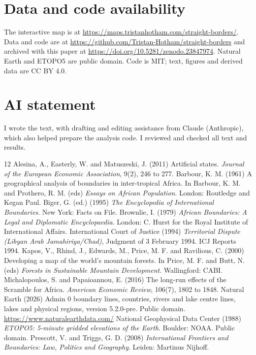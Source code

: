 \documentclass[11pt,a4paper]{article}
\begin{document}
\section*{Data and code availability}
The interactive map is at \url{https://maps.tristanhotham.com/straight-borders/}. Data and code are at \url{https://github.com/Tristan-Hotham/straight-borders} and archived with this paper at \url{https://doi.org/10.5281/zenodo.23847974}. Natural Earth and ETOPO5 are public domain. Code is MIT; text, figures and derived data are CC BY 4.0.

\section*{AI statement}
I wrote the text, with drafting and editing assistance from Claude (Anthropic), which also helped prepare the analysis code. I reviewed and checked all text and results.

\begin{thebibliography}{12}
 Alesina, A., Easterly, W. and Matuszeski, J. (2011) Artificial states. \emph{Journal of the European Economic Association}, 9(2), 246 to 277.
 Barbour, K. M. (1961) A geographical analysis of boundaries in inter-tropical Africa. In Barbour, K. M. and Prothero, R. M. (eds) \emph{Essays on African Population}. London: Routledge and Kegan Paul.
 Biger, G. (ed.) (1995) \emph{The Encyclopedia of International Boundaries}. New York: Facts on File.
 Brownlie, I. (1979) \emph{African Boundaries: A Legal and Diplomatic Encyclopaedia}. London: C. Hurst for the Royal Institute of International Affairs.
 International Court of Justice (1994) \emph{Territorial Dispute (Libyan Arab Jamahiriya/Chad)}, Judgment of 3 February 1994. ICJ Reports 1994.
 Kapos, V., Rhind, J., Edwards, M., Price, M. F. and Ravilious, C. (2000) Developing a map of the world's mountain forests. In Price, M. F. and Butt, N. (eds) \emph{Forests in Sustainable Mountain Development}. Wallingford: CABI.
 Michalopoulos, S. and Papaioannou, E. (2016) The long-run effects of the Scramble for Africa. \emph{American Economic Review}, 106(7), 1802 to 1848.
 Natural Earth (2026) Admin 0 boundary lines, countries, rivers and lake centre lines, lakes and physical regions, version 5.2.0-pre. Public domain. \url{https://www.naturalearthdata.com/}
 National Geophysical Data Center (1988) \emph{ETOPO5: 5-minute gridded elevations of the Earth}. Boulder: NOAA. Public domain.
 Prescott, V. and Triggs, G. D. (2008) \emph{International Frontiers and Boundaries: Law, Politics and Geography}. Leiden: Martinus Nijhoff.
\end{thebibliography}
\end{document}
